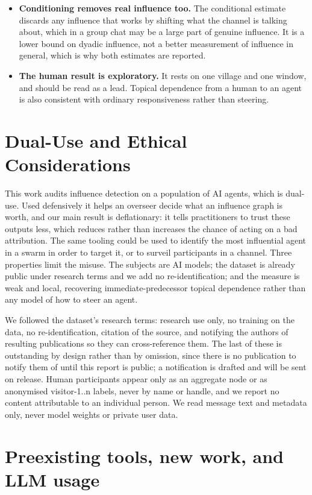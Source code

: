 \documentclass[11pt]{article}
\begin{document}
\begin{itemize}
\item \textbf{Conditioning removes real influence too.} The conditional estimate discards any influence that works by shifting what the channel is talking about, which in a group chat may be a large part of genuine influence. It is a lower bound on dyadic influence, not a better measurement of influence in general, which is why both estimates are reported.
\item \textbf{The human result is exploratory.} It rests on one village and one window, and should be read as a lead. Topical dependence from a human to an agent is also consistent with ordinary responsiveness rather than steering.
\end{itemize}

\section{Dual-Use and Ethical Considerations}

This work audits influence detection on a population of AI agents, which is dual-use. Used defensively it helps an overseer decide what an influence graph is worth, and our main result is deflationary: it tells practitioners to trust these outputs less, which reduces rather than increases the chance of acting on a bad attribution. The same tooling could be used to identify the most influential agent in a swarm in order to target it, or to surveil participants in a channel. Three properties limit the misuse. The subjects are AI models; the dataset is already public under research terms and we add no re-identification; and the measure is weak and local, recovering immediate-predecessor topical dependence rather than any model of how to steer an agent.

We followed the dataset's research terms: research use only, no training on the data, no re-identification, citation of the source, and notifying the authors of resulting publications so they can cross-reference them. The last of these is outstanding by design rather than by omission, since there is no publication to notify them of until this report is public; a notification is drafted and will be sent on release. Human participants appear only as an aggregate node or as anonymised visitor-1..n labels, never by name or handle, and we report no content attributable to an individual person. We read message text and metadata only, never model weights or private user data.

\section{Preexisting tools, new work, and LLM usage}
\end{document}
